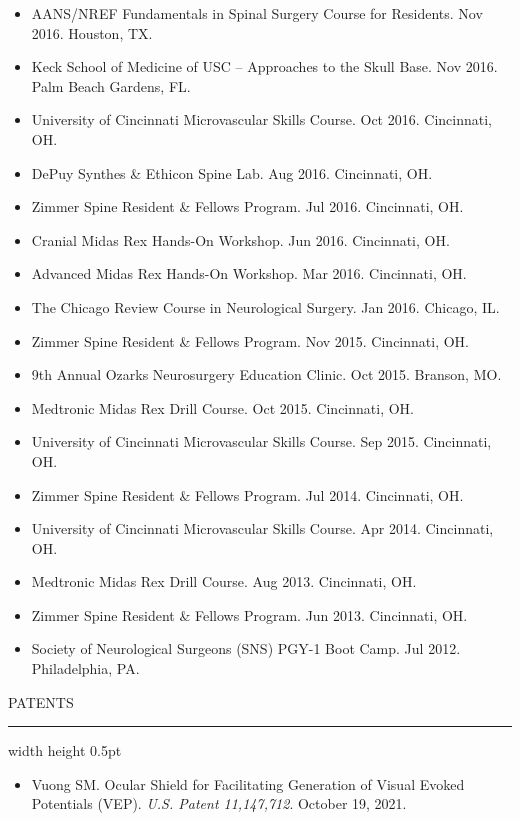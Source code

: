 \documentclass[11pt, a4paper]{article}
\newcommand{\cvsection}[1]{%
  \par\vspace{1.5ex}%
  {\Large\color{primary}\scshape\MakeUppercase{#1}}%
  \nopagebreak[4]%
  \vspace{0.3em}%
  \nopagebreak[4]%
  \hrule width \linewidth height 0.5pt \color{primary}%
  \vspace{0.5ex}%
}
\begin{document}
\begin{itemize}
  \item AANS/NREF Fundamentals in Spinal Surgery Course for Residents. Nov 2016. Houston, TX.
  \item Keck School of Medicine of USC -- Approaches to the Skull Base. Nov 2016. Palm Beach Gardens, FL.
  \item University of Cincinnati Microvascular Skills Course. Oct 2016. Cincinnati, OH.
  \item DePuy Synthes \& Ethicon Spine Lab. Aug 2016. Cincinnati, OH.
  \item Zimmer Spine Resident \& Fellows Program. Jul 2016. Cincinnati, OH.
  \item Cranial Midas Rex Hands-On Workshop. Jun 2016. Cincinnati, OH.
  \item Advanced Midas Rex Hands-On Workshop. Mar 2016. Cincinnati, OH.
  \item The Chicago Review Course in Neurological Surgery. Jan 2016. Chicago, IL.
  \item Zimmer Spine Resident \& Fellows Program. Nov 2015. Cincinnati, OH.
  \item 9th Annual Ozarks Neurosurgery Education Clinic. Oct 2015. Branson, MO.
  \item Medtronic Midas Rex Drill Course. Oct 2015. Cincinnati, OH.
  \item University of Cincinnati Microvascular Skills Course. Sep 2015. Cincinnati, OH.
  \item Zimmer Spine Resident \& Fellows Program. Jul 2014. Cincinnati, OH.
  \item University of Cincinnati Microvascular Skills Course. Apr 2014. Cincinnati, OH.
  \item Medtronic Midas Rex Drill Course. Aug 2013. Cincinnati, OH.
  \item Zimmer Spine Resident \& Fellows Program. Jun 2013. Cincinnati, OH.
  \item Society of Neurological Surgeons (SNS) PGY-1 Boot Camp. Jul 2012. Philadelphia, PA.
\end{itemize}
\vspace{0.5em}

\cvsection{Patents}
\begin{itemize}
  \setlength\itemindent{0.25em}
  \item Vuong SM. Ocular Shield for Facilitating Generation of Visual Evoked Potentials (VEP). \textit{U.S. Patent 11,147,712}. October 19, 2021.
\end{itemize}
\vspace{0.5em}
\end{document}

